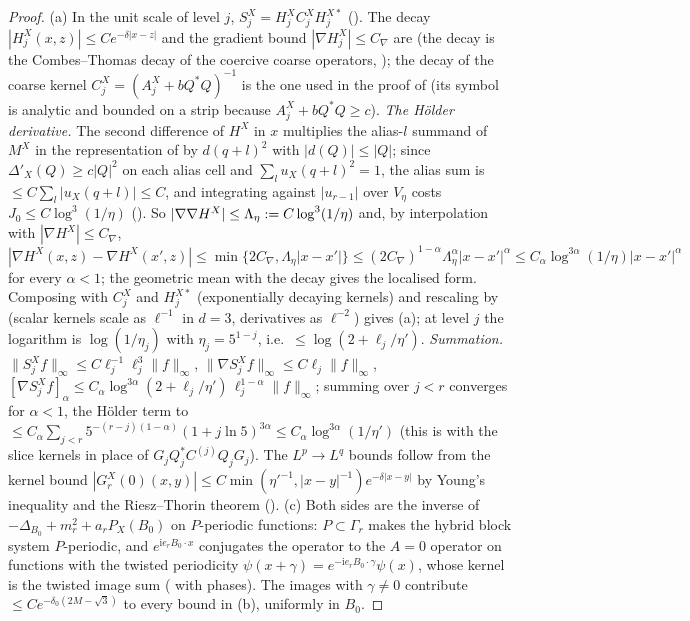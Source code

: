 \begin{proof}
(a) In the unit scale of level $j$, $S^X_j=H^X_jC^X_jH^{X*}_j$ (). The decay $|H^X_j(x,z)|\le Ce^{-\delta|x-z|}$ and the gradient bound $|\nabla H^X_j|\le C_\nabla$ are  (the decay is the Combes--Thomas decay of the coercive coarse operators, \cite{CT73}); the decay of the coarse kernel $C^X_j=(A^X_j+bQ^*Q)^{-1}$ is the one used in the proof of  (its symbol is analytic and bounded on a strip because $A^X_j+bQ^*Q\ge c$). \emph{The H\"older derivative.} The second difference of $H^X$ in $x$ multiplies the alias-$l$ summand of $M^X$ in the representation of  by $d(q+l)^2$ with $|d(Q)|\le|Q|$; since $\Delta'_X(Q)\ge c|Q|^2$ on each alias cell and $\sum_lu_X(q+l)^2=1$, the alias sum is $\le C\sum_l|u_X(q+l)|\le C$, and integrating against $|u_{r-1}|$ over $V_\eta$ costs $J_0\le C\log^3(1/\eta)$ (). So $|\nabla\nabla H^X|\le\Lambda_\eta:= C\log^3(1/\eta)$ and, by interpolation with $|\nabla H^X|\le C_\nabla$,
\[
|\nabla H^X(x,z)-\nabla H^X(x',z)|\le\min\{2C_\nabla,\Lambda_\eta|x-x'|\}\le(2C_\nabla)^{1-\alpha}\Lambda_\eta^{\alpha}|x-x'|^\alpha\le C_\alpha\log^{3\alpha}(1/\eta)|x-x'|^\alpha
\]
for every $\alpha<1$; the geometric mean with the decay gives the localised form. Composing with $C^X_j$ and $H^{X*}_j$ (exponentially decaying kernels) and rescaling by \cite[(2.20)]{K1} (scalar kernels scale as $\ell^{-1}$ in $d=3$, derivatives as $\ell^{-2}$) gives (a); at level $j$ the logarithm is $\log(1/\eta_j)$ with $\eta_j=5^{1-j}$, i.e.\ $\le\log(2+\ell_j/\eta')$. \emph{Summation.} $\|S^X_jf\|_\infty\le C\ell_j^{-1}\ell_j^3\|f\|_\infty$, $\|\nabla S^X_jf\|_\infty\le C\ell_j\|f\|_\infty$, $[\nabla S^X_jf]_\alpha\le C_\alpha\log^{3\alpha}(2+\ell_j/\eta')\,\ell_j^{1-\alpha}\|f\|_\infty$; summing over $j<r$ converges for $\alpha<1$, the H\"older term to $\le C_\alpha\sum_{j<r}5^{-(r-j)(1-\alpha)}(1+j\ln5)^{3\alpha}\le C_\alpha\log^{3\alpha}(1/\eta')$ (this is \cite[(2.38)--(2.39)]{Ba4} with the slice kernels in place of $G_jQ_j^*C^{(j)}Q_jG_j$). The $L^p\to L^q$ bounds follow from the kernel bound $|G^X_r(0)(x,y)|\le C\min(\eta'^{-1},|x-y|^{-1})e^{-\delta|x-y|}$ by Young's inequality and the Riesz--Thorin theorem (\cite[p.~583]{Ba4}). (c) Both sides are the inverse of $-\Delta_{B_0}+m_r^2+a_rP_X(B_0)$ on $P$-periodic functions: $P\subset\Gamma_r$ makes the hybrid block system $P$-periodic, and $e^{\mathrm ie_rB_0\cdot x}$ conjugates the operator to the $A=0$ operator on functions with the twisted periodicity $\psi(x+\gamma)=e^{-\mathrm ie_rB_0\cdot\gamma}\psi(x)$, whose kernel is the twisted image sum (\cite[(B.3)]{K2} with phases). The images with $\gamma\ne0$ contribute $\le Ce^{-\delta_0(2M-\sqrt3)}$ to every bound in (b), uniformly in $B_0$.
\end{proof}

